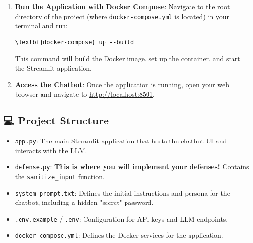 \documentclass{article}
\begin{document}
\begin{enumerate}[label=\arabic*.]
    Your \texttt{.env} file should look similar to this for local Ollama usage:
\begin{Verbatim}[commandchars=\\\{\}]
\# Uncomment one of the two options below
\# Either use the models on chat.science.ru.nl
\# Or use any local Ollama model

\# When using chat.science.ru.nl
\# API_KEY=your_api_key_here
\# MODEL_NAME=gpt-oss:120b
\# BASE_URL=https://chat.science.ru.nl/api

\# When using Ollama
MODEL_NAME=llama3.2
BASE_URL=http://localhost:11434/v1
\end{Verbatim}
    \item \textbf{Run the Application with Docker Compose}:
    Navigate to the root directory of the project (where \texttt{docker-compose.yml} is located) in your terminal and run:

\begin{Verbatim}[commandchars=\\\{\}]
    \textbf{docker-compose} up --build
\end{Verbatim}

    This command will build the Docker image, set up the container, and start the Streamlit application.

    \item \textbf{Access the Chatbot}:
    Once the application is running, open your web browser and navigate to \url{http://localhost:8501}.
\end{enumerate}

\subsection*{💻 Project Structure}

\begin{itemize}
    \item \texttt{app.py}: The main Streamlit application that hosts the chatbot UI and interacts with the LLM.
    \item \texttt{defense.py}: \textbf{This is where you will implement your defenses!} Contains the \texttt{sanitize\_input} function.
    \item \texttt{system\_prompt.txt}: Defines the initial instructions and persona for the chatbot, including a hidden "secret" password.
    \item \texttt{.env.example} / \texttt{.env}: Configuration for API keys and LLM endpoints.
    \item \texttt{docker-compose.yml}: Defines the Docker services for the application.
\end{itemize}
\end{document}
